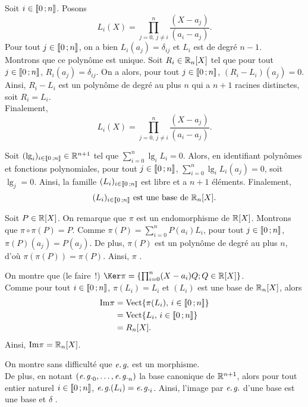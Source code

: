 \begin{solution}
\begin{questions}
\item Soit $i \in \llbracket 0\,; n \rrbracket$. Posons 
\[
L_i(X) = \prod_{j=0,\, j \neq i}^n \frac{(X - a_j)}{(a_i - a_j)}.
\]
Pour tout $j \in \llbracket 0\,; n \rrbracket$, on a bien $L_i(a_j) = \delta_{ij}$ et $L_i$ est de degré $n-1$. \\
Montrons que ce polynôme est unique. Soit $R_i \in \mathbb{R}_n[X]$ tel que pour tout $j \in \llbracket 0\,; n \rrbracket$, $R_i(a_j) = \delta_{ij}$. On a alors, pour tout $j \in \llbracket 0\,; n \rrbracket$, $(R_i - L_i)(a_j) = 0$. Ainsi, $R_i - L_i$ est un polynôme de degré au plus $n$ qui a $n+1$ racines distinctes, soit $R_i = L_i$. \\
Finalement,
{
\[L_i(X) = \prod_{j=0,\, j \neq i}^n \frac{(X - a_j)}{(a_i - a_j)}.\]
}

\item Soit $(\lg_i)_{i\in\llbracket 0\,; n \rrbracket} \in \mathbb{R}^{n+1}$ tel que $\sum_{i=0}^n \lg_i L_i = 0$. Alors, en identifiant polynômes et fonctions polynomiales, pour tout $j \in \llbracket 0\,; n \rrbracket$, $\sum_{i=0}^n \lg_i L_i(a_j) = 0$, soit $\lg_j = 0$. Ainsi, la famille $(L_i)_{i\in\llbracket 0\,; n \rrbracket}$ est libre et a $n+1$ éléments. Finalement,
{\[
(L_i)_{i\in\llbracket 0\,; n \rrbracket} \text{ est une base de } \mathbb{R}_n[X].
\]
}


\item Soit $P \in \mathbb{R}[X]$. On remarque que $\pi$ est un endomorphisme de $\mathbb{R}[X]$. Montrons que $\pi \circ \pi(P) = P$. Comme $\pi(P) = \sum_{i=0}^n P(a_i) L_i$, pour tout $j \in \llbracket 0\,; n \rrbracket$, $\pi(P)(a_j) = P(a_j)$. De plus, $\pi(P)$ est un polynôme de degré au plus $n$, d'où $\pi(\pi(P)) = \pi(P)$. Ainsi,
{
$\pi$ .
}

\item On montre que (le faire~!) $\Ker \pi = \left\{ \prod_{i=0}^n (X - a_i) Q ; Q \in \R[X] \right\}$.\\
Comme pour tout $i \in \llbracket 0\,; n \rrbracket$, $\pi(L_i) = L_i$ et $(L_i)$ est une base de $\mathbb{R}_n[X]$, alors
\begin{align*}
\mathrm{Im} \pi &= \mathrm{Vect}\{\pi(L_i),\, i \in \llbracket 0\,; n \rrbracket\} \\
&= \mathrm{Vect}\{L_i,\, i \in \llbracket 0\,; n \rrbracket\} \\
&= R_n[X].
\end{align*}
Ainsi,
{
$\mathrm{Im} \pi = \mathbb{R}_n[X]$.
}

\item On montre sans difficulté que $\textit{e.\nobreak\hspace{1pt}{}g.}$ est un morphisme. \\
De plus, en notant $(\textit{e.\nobreak\hspace{1pt}{}g.}_0,\ldots,\textit{e.\nobreak\hspace{1pt}{}g.}_n)$ la base canonique de $\mathbb{R}^{n+1}$, alors pour tout entier naturel $i \in \llbracket 0\,; n \rrbracket$, $\textit{e.\nobreak\hspace{1pt}{}g.}(L_i) = \textit{e.\nobreak\hspace{1pt}{}g.}_i$. Ainsi, l'image par $\textit{e.\nobreak\hspace{1pt}{}g.}$ d'une base est une base et
{
$\delta$ .
}


\end{questions}
\end{solution}
